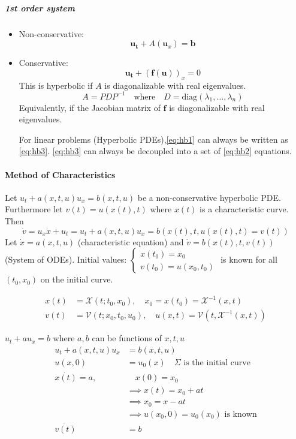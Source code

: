 \subparagraph{1st order system}
\begin{itemize}
  \item Non-conservative: \[\symbf{u_t} + A(\symbf{u}_x) = \symbf{b}\tag{3}\]\label{eq:hb3}
  \item Conservative: \[\symbf{u_t} + (\symbf{f}(\symbf{u}))_x = 0\]
        This is hyperbolic if \(A\) is diagonalizable with real eigenvalues.
        \[
          A = PDP^{-1} \quad \text{where} \quad D = \text{diag}(\lambda_1, \ldots, \lambda_n)
        \]
        Equivalently, if the Jacobian matrix of \(\symbf{f}\) is diagonalizable with real eigenvalues.

        For linear problems (Hyperbolic PDEs),\eqref{eq:hb1} can always be written as \eqref{eq:hb3}.
        \eqref{eq:hb3} can always be decoupled into a set of \eqref{eq:hb2} equations.
\end{itemize}
\paragraph{Method of Characteristics}
Let \(u_t + a(x,t,u)u_x = b(x,t,u)\) be a non-conservative hyperbolic PDE. Furthermore let \(v(t) = u(x(t), t)\) where \(x(t)\) is a characteristic curve. Then
\[
  \dot{v} = u_x \dot{x} + u_t = u_t + a(x,t,u)u_x = b(x(t), t, u(x(t), t)=v(t))
\]
Let \(\dot{x} = a(x,t,u)\) (characteristic equation) and \(\dot{v} = b(x(t), t, v(t))\) (System of ODEs).
Initial values: \(\begin{cases} x(t_0) = x_0 \\ v(t_0) = u(x_0, t_0) \end{cases}\) is known for all \((t_0, x_0)\) on the initial curve.

\begin{align*}
  x(t) & = \mathcal{X}(t; t_0, x_0), \quad x_0 = x(t_0) = \mathcal{X}^{-1}(x, t)               \\
  v(t) & = \mathcal{V}(t; x_0, t_0, u_0), \quad u(x,t) = \mathcal{V}(t, \mathcal{X}^{-1}(x,t))
\end{align*}

\begin{example}{}{}
  \(u_t + a u_x = b\) where \(a, b\) can be functions of \(x, t, u\)
  \begin{align*}
    u_t + a(x,t,u)u_x      & = b(x,t,u)                                           \\
    u(x,0)                 & = u_0(x)   \quad \Sigma \text{ is the initial curve} \\
    \dot{x(t)}        = a, & \quad x(0) = x_0                                     \\
                           & \implies x(t) = x_0 + at                             \\
                           & \implies x_0 = x - at                                \\
                           & \implies u(x_0, 0) = u_0(x_0) \text{ is known}       \\
    \dot{v(t)}             & = b
  \end{align*}


\end{example}


